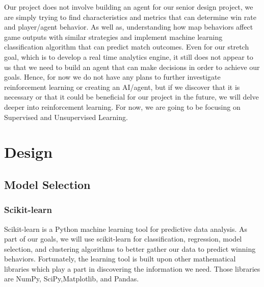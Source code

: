 \documentclass[a4paper,12pt]{report}
\begin{document}
Our project does not involve building an agent for our senior design project, we are simply trying to find characteristics and metrics that can determine win rate and player/agent behavior. As well as, understanding how map behaviors affect game outputs with similar strategies and implement machine learning classification algorithm that can predict match outcomes. Even for our stretch goal, which is to develop a real time analytics engine, it still does not appear to us that we need to build an agent that can make decisions in order to achieve our goals. Hence, for now we do not have any plans to further investigate reinforcement learning or creating an AI/agent, but if we discover that it is necessary or that it could be beneficial for our project in the future, we will delve deeper into reinforcement learning. For now, we are going to be focusing on Supervised and Unsupervised Learning.


\chapter{Design}
\section{Model Selection}
\subsection{Scikit-learn}

Scikit-learn is a Python machine learning tool for predictive data analysis. As part of our goals, we will use scikit-learn for classification, regression, model selection, and clustering algorithms to better gather our data to predict winning behaviors. Fortunately, the learning tool is built upon other mathematical libraries which play a part in discovering the information we need. Those libraries are NumPy, SciPy,Matplotlib, and Pandas.
\end{document}
